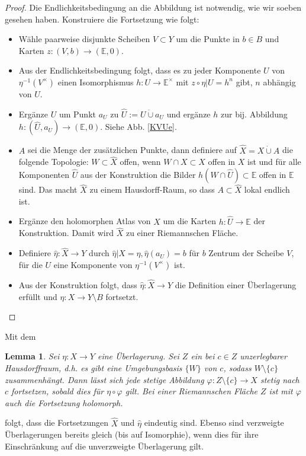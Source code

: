 \documentclass[12pt,a4paper]{article}
\theoremstyle{plain}
\newtheorem{Lemma}[Theorem]{Lemma}
\newcommand{\cupdot}{\mathbin{\dot{\cup}}}
\numberwithin{equation}{section}
\begin{document}
\begin{proof}
Die Endlichkeitsbedingung an die Abbildung ist notwendig, wie wir soeben gesehen haben. Konstruiere die Fortsetzung wie folgt:
\begin{itemize}
\item Wähle paarweise disjunkte Scheiben $V\subset Y$ um die Punkte in $b\in B$ und Karten $z:(V,b)\rightarrow (\mathbb{E},0)$.
\item Aus der Endlichkeitsbedingung folgt, dass es zu jeder Komponente $U$ von $\eta^{-1}(V^\times)$ einen Isomorphismus $h: U\rightarrow \mathbb{E}^\times$ mit $z\circ \eta|U = h^n$ gibt, $n$ abhängig von $U$.
\item Ergänze $U$ um Punkt $a_U$ zu $\hat{U}:=U\cupdot a_U$ und ergänze $h$ zur bij. Abbildung $h: (\hat{U},a_U) \rightarrow (\mathbb{E},0)$. Siehe Abb. \ref{KVUe}.
\item $A$ sei die Menge der zusätzlichen Punkte, dann definiere auf $\hat{X} = X \cupdot A$ die folgende Topologie: $W\subset \hat{X}$ offen, wenn $W\cap X \subset X$ offen in $X$ ist und für alle Komponenten $\hat{U}$ aus der Konstruktion die Bilder $h(W\cap \hat{U})\subset \mathbb{E}$ offen in $\mathbb{E}$ sind. Das macht $\hat{X}$ zu einem Hausdorff-Raum, so dass $A\subset \hat{X}$ lokal endlich ist.
\item Ergänze den holomorphen Atlas von $X$ um die Karten $h:\hat{U}\rightarrow \mathbb{E}$ der Konstruktion. Damit wird $\hat{X}$ zu einer Riemannschen Fläche.
\item Definiere $\hat{\eta}: \hat{X}\rightarrow Y$ durch $\hat{\eta}|X = \eta, \hat{\eta}(a_U)=b$ für $b$ Zentrum der Scheibe $V$, für die $U$ eine Komponente von $\eta^{-1}(V^\times)$ ist.
\item Aus der Konstruktion folgt, dass $\hat{\eta}:\hat{X}\rightarrow Y$ die Definition einer Überlagerung erfüllt und $\eta: X\rightarrow Y\setminus B$ fortsetzt.
\end{itemize}
\end{proof} Mit dem
\begin{Lemma} Sei $\eta : X \rightarrow Y$ eine Überlagerung. Sei $Z$ ein bei $c\in Z$ unzerlegbarer Hausdorffraum, d.h. es gibt eine Umgebungsbasis $\{W\}$ von $c$, sodass $W\setminus \{c\}$ zusammenhängt. Dann lässt sich jede stetige Abbildung $\varphi : Z\setminus \{c\} \rightarrow X$ stetig nach $c$ fortsetzen, sobald dies für $\eta\circ\varphi$ gilt. Bei einer Riemannschen
Fläche $Z$ ist mit $\varphi$ auch die Fortsetzung holomorph.
\end{Lemma}
folgt, dass die Fortsetzungen $\hat{X}$ und $\hat{\eta}$ eindeutig sind. Ebenso sind verzweigte Überlagerungen bereits gleich (bis auf Isomorphie), wenn dies für ihre Einschränkung auf die unverzweigte Überlagerung gilt.
\end{document}
